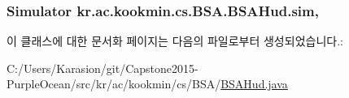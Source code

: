 \subsubsection[{sim}]{\setlength{\rightskip}{0pt plus 5cm}Simulator kr.\+ac.\+kookmin.\+cs.\+B\+S\+A.\+B\+S\+A\+Hud.\+sim\hspace{0.3cm}{\ttfamily [static]}, {\ttfamily [private]}}\label{classkr_1_1ac_1_1kookmin_1_1cs_1_1_b_s_a_1_1_b_s_a_hud_a94269498fba32b6567a641dc5fa3f3be}


이 클래스에 대한 문서화 페이지는 다음의 파일로부터 생성되었습니다.\+:\begin{DoxyCompactItemize}
\item 
C\+:/\+Users/\+Karasion/git/\+Capstone2015-\/\+Purple\+Ocean/src/kr/ac/kookmin/cs/\+B\+S\+A/\hyperlink{_b_s_a_hud_8java}{B\+S\+A\+Hud.\+java}\end{DoxyCompactItemize}
